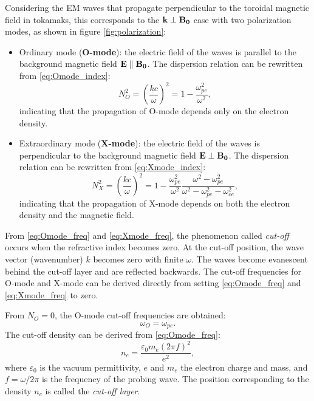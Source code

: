 Considering the EM waves that propagate perpendicular to the toroidal magnetic field in tokamaks, this corresponds to the $\boldsymbol{\mathrm{k}} \perp \boldsymbol{\mathrm{B_0}}$ case with two polarization modes, as shown in figure \ref{fig:polarization}:%
\begin{itemize}
%
  \item Ordinary mode (\textbf{O-mode}): the electric field of the waves is parallel to the background magnetic field $\boldsymbol{\mathrm{E}}\parallel\boldsymbol{\mathrm{B_0}}$. The dispersion relation can be rewritten from \eqref{eq:Omode_index}: %
      \begin{equation}\label{eq:Omode_freq}
      N_O^2=\left(\frac{kc}{\omega}\right)^2=1-\frac{\omega_{pe}^2}{\omega^2},
      \end{equation}
      indicating that the propagation of O-mode depends only on the electron density.
%
  \item Extraordinary mode (\textbf{X-mode}): the electric field of the waves is perpendicular to the background magnetic field  $\boldsymbol{\mathrm{E}}\perp\boldsymbol{\mathrm{B_0}}$. The dispersion relation can be rewritten from \eqref{eq:Xmode_index}: %
      \begin{equation}\label{eq:Xmode_freq}
      N_X^2=\left(\frac{kc}{\omega}\right)^2=1-\frac{\omega_{pe}^2}{\omega^2}\frac{\omega^2-\omega_{pe}^2}{\omega^2-\omega_{pe}^2-\omega_{ce}^2},
      \end{equation}
      indicating that the propagation of X-mode depends on both the electron density and the magnetic field.
\end{itemize}

From \eqref{eq:Omode_freq} and \eqref{eq:Xmode_freq}, the phenomenon called \emph{cut-off} occurs when the refractive index becomes zero. At the cut-off position, the wave vector (wavenumber) $k$ becomes zero with finite $\omega$. The waves become evanescent behind the cut-off layer and are reflected backwards. The cut-off frequencies for O-mode and X-mode can be derived directly from setting \eqref{eq:Omode_freq} and \eqref{eq:Xmode_freq} to zero.


From $N_O=0$, the O-mode cut-off frequencies are obtained:%
\begin{equation}
\omega_O=\omega_{pe}.
\end{equation}
\noindent The cut-off density can be derived from \eqref{eq:Omode_freq}:%
\begin{equation}\label{eq:nc}
  n_c=\frac{\varepsilon_0m_e(2\pi{f})^2}{e^2},
\end{equation}
\noindent where $\varepsilon_0$ is the vacuum permittivity, $e$ and $m_e$ the electron charge and mass, and $f=\omega/2\pi$ is the frequency of the probing wave. The position corresponding to the density $n_c$ is called the \emph{cut-off layer}.


